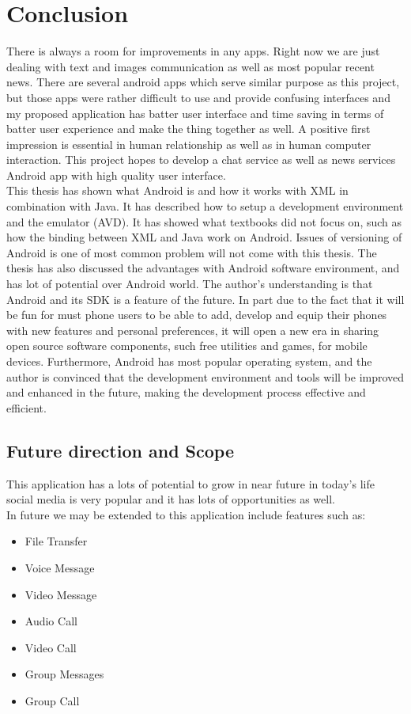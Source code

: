 \linespread{2}
\chapter{Conclusion}\label{chap5}
\thispagestyle{empty}


\vspace*{40 ex}
There is always a room for improvements in any apps. Right now we are just dealing with text and images communication as well as most popular recent news. There are several android apps which serve similar purpose as this project, but those apps were rather difficult to use and provide confusing interfaces and my proposed application has batter user interface and time saving in terms of batter user experience and make the thing together as well. A positive first impression is essential in human relationship as well as in human computer interaction. This project hopes to develop a chat service as well as news services Android app with high quality user interface.\\

\noindent
This thesis has shown what Android is and how it works with XML in combination with Java. It has described how to setup a development environment and the emulator (AVD). It has showed what textbooks did not focus on, such as how the binding between XML and Java work on Android. Issues of versioning of Android is one of most common problem will not come with this thesis. The thesis has also discussed the advantages with Android software environment, and has lot of potential over Android world. The author’s understanding is that Android and its SDK is a feature of the future. In part due to the fact that it will be fun for must phone users to be able to add, develop and equip their phones with new features and personal preferences, it will open a new era in sharing open source software components, such free utilities and games, for mobile devices. Furthermore, Android has most popular operating system, and the author is convinced that the development environment and tools will be improved and enhanced in the future, making the development process effective and efficient.

\section{Future direction and Scope}
This application has a lots of potential to grow in near future in today's life social media is very popular and it has lots of opportunities as well.\\
In future we may be extended to this application include features such as:
\begin{itemize}
	\item File Transfer
	\item Voice Message
	\item Video Message
	\item Audio Call
	\item Video Call
	\item Group Messages
	\item Group Call
\end{itemize}

